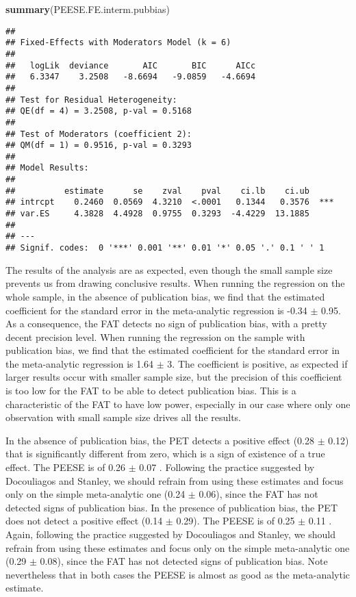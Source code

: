 \documentclass[]{book}
\newenvironment{Shaded}{\begin{snugshade}}{\end{snugshade}}
\newcommand{\KeywordTok}[1]{\textcolor[rgb]{0.13,0.29,0.53}{\textbf{#1}}}
\newcommand{\NormalTok}[1]{#1}
\theoremstyle{definition}
\theoremstyle{definition}
\theoremstyle{definition}
\theoremstyle{remark}
\begin{document}
\begin{Shaded}
\begin{Highlighting}[]
\KeywordTok{summary}\NormalTok{(PEESE.FE.interm.pubbias)}
\end{Highlighting}
\end{Shaded}

\begin{verbatim}
## 
## Fixed-Effects with Moderators Model (k = 6)
## 
##   logLik  deviance       AIC       BIC      AICc 
##   6.3347    3.2508   -8.6694   -9.0859   -4.6694   
## 
## Test for Residual Heterogeneity:
## QE(df = 4) = 3.2508, p-val = 0.5168
## 
## Test of Moderators (coefficient 2):
## QM(df = 1) = 0.9516, p-val = 0.3293
## 
## Model Results:
## 
##          estimate      se    zval    pval    ci.lb    ci.ub 
## intrcpt    0.2460  0.0569  4.3210  <.0001   0.1344   0.3576  *** 
## var.ES     4.3828  4.4928  0.9755  0.3293  -4.4229  13.1885      
## 
## ---
## Signif. codes:  0 '***' 0.001 '**' 0.01 '*' 0.05 '.' 0.1 ' ' 1
\end{verbatim}

The results of the analysis are as expected, even though the small sample size prevents us from drawing conclusive results.
When running the regression on the whole sample, in the absence of publication bias, we find that the estimated coefficient for the standard error in the meta-analytic regression is -0.34 \(\pm\) 0.95.
As a consequence, the FAT detects no sign of publication bias, with a pretty decent precision level.
When running the regression on the sample with publication bias, we find that the estimated coefficient for the standard error in the meta-analytic regression is 1.64 \(\pm\) 3.
The coefficient is positive, as expected if larger results occur with smaller sample size, but the precision of this coefficient is too low for the FAT to be able to detect publication bias.
This is a characteristic of the FAT to have low power, especially in our case where only one observation with small sample size drives all the results.

In the absence of publication bias, the PET detects a positive effect (0.28 \(\pm\) 0.12) that is significantly different from zero, which is a sign of existence of a true effect.
The PEESE is of 0.26 \(\pm\) 0.07 .
Following the practice suggested by Docouliagos and Stanley, we should refrain from using these estimates and focus only on the simple meta-analytic one (0.24 \(\pm\) 0.06), since the FAT has not detected signs of publication bias.
In the presence of publication bias, the PET does not detect a positive effect (0.14 \(\pm\) 0.29).
The PEESE is of 0.25 \(\pm\) 0.11 .
Again, following the practice suggested by Docouliagos and Stanley, we should refrain from using these estimates and focus only on the simple meta-analytic one (0.29 \(\pm\) 0.08), since the FAT has not detected signs of publication bias.
Note nevertheless that in both cases the PEESE is almost as good as the meta-analytic estimate.
\end{document}
